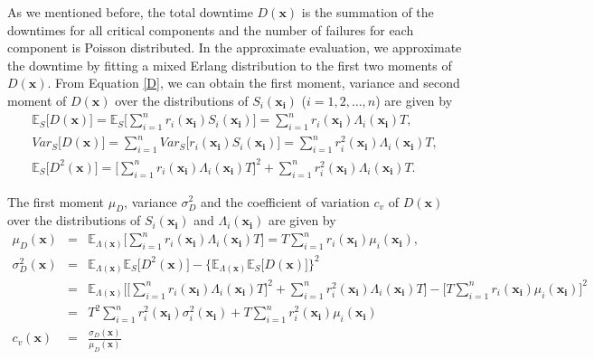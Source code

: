 \documentclass[preprint,12pt]{elsarticle}
\begin{document}
As we mentioned before, the total downtime $D(\boldsymbol{x})$ is the summation of the downtimes for all critical components and the number of failures for each component is Poisson distributed. In the approximate evaluation, we approximate the downtime by fitting a mixed Erlang distribution to the first two moments of $D(\boldsymbol{x})$. From Equation \eqref{D}, we can obtain the first moment, variance and second moment of $D(\boldsymbol{x})$ over the distributions of $S_{i}(\boldsymbol{x_{i}})$ ($i=1,2,\dots,n$) are given by
\begin{eqnarray}
\mathbb{E}_{S}\bigg[D(\boldsymbol{x})\bigg]=\mathbb{E}_{S}\bigg[\sum_{i=1}^{n}{r_{i}(\boldsymbol{x_{i}})S_{i}(\boldsymbol{x_{i}})}\bigg]=\sum_{i=1}^{n}{r_{i}(\boldsymbol{x_{i}})\Lambda_{i}(\boldsymbol{x_{i}})T},
\label{ED1}\\
Var_{S}\bigg[D(\boldsymbol{x})\bigg]=\sum_{i=1}^{n}{Var_{S}\bigg[{r_{i}(\boldsymbol{x_{i}})S_{i}(\boldsymbol{x_{i}})}\bigg]}=\sum_{i=1}^{n}{r_{i}^{2}(\boldsymbol{x_{i}})\Lambda_{i}(\boldsymbol{x_{i}})T},
\label{VD1}\\
\mathbb{E}_{S}\bigg[D^{2}(\boldsymbol{x}) \bigg]= \bigg[\sum_{i=1}^{n}{r_{i}(\boldsymbol{x_{i}})\Lambda_{i}(\boldsymbol{x_{i}})T}\bigg]^{2} + \sum_{i=1}^{n}{r_{i}^{2}(\boldsymbol{x_{i}})\Lambda_{i}(\boldsymbol{x_{i}})T}.
\end{eqnarray}

The first moment $\mu_{D}$, variance $\sigma^{2}_{D}$ and the coefficient of variation $c_{v}$  of $D(\boldsymbol{x})$ over the distributions of $S_{i}(\boldsymbol{x_{i}})$ and $\Lambda_{i}(\boldsymbol{x_{i}})$ are given by
\begin{eqnarray}
\mu_{D}(\boldsymbol{x})&=&\mathbb{E}_{\Lambda(\boldsymbol{x})}\bigg[\sum_{i=1}^{n}{r_{i}(\boldsymbol{x_{i}})\Lambda_{i}(\boldsymbol{x_{i}})T}\bigg]=T\sum_{i=1}^{n}{r_{i}(\boldsymbol{x_i})\mu_{i}(\boldsymbol{x_i})},
\label{muD}\\
\sigma^{2}_{D}(\boldsymbol{x})&=&\mathbb{E}_{\Lambda(\boldsymbol{x})}\mathbb{E}_{S} \bigg[D^{2}(\boldsymbol{x}) \bigg]- \bigg\{\mathbb{E}_{\Lambda(\boldsymbol{x})}\mathbb{E}_{S}\bigg[D(\boldsymbol{x}) \bigg] \bigg\}^{2} \nonumber\\
&=& \mathbb{E}_{\Lambda(\boldsymbol{x})}\bigg[\bigg[\sum_{i=1}^{n}{r_{i}(\boldsymbol{x_{i}})\Lambda_{i}(\boldsymbol{x_{i}})T}\bigg]^{2} +\sum_{i=1}^{n}{r_{i}^{2}(\boldsymbol{x_{i}})\Lambda_{i}(\boldsymbol{x_{i}})T}\bigg]-\bigg[T\sum_{i=1}^{n}{r_{i}(\boldsymbol{x_i})\mu_{i}(\boldsymbol{x_i})}\bigg]^{2}\nonumber\\
&=&T^{2}\sum_{i=1}^{n}{r_{i}^{2}(\boldsymbol{x_i})\sigma_{i}^{2}(\boldsymbol{x_i})}+T\sum_{i=1}^{n}{r_{i}^{2}(\boldsymbol{x_i})\mu_{i}(\boldsymbol{x_i})}
\label{sigma}\\
c_{v}(\boldsymbol{x}) &=& \frac{\sigma_{D}(\boldsymbol{x})}{\mu_{D}(\boldsymbol{x})}
\end{eqnarray}
\end{document}
